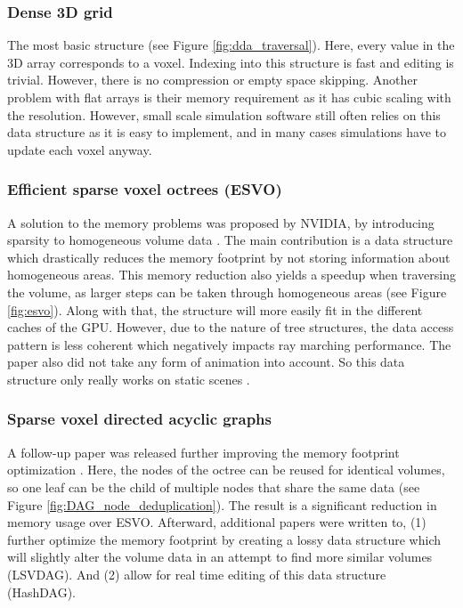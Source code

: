 \subsubsection{Dense 3D grid} \label{related_work:voxel_data_structures:dense_grid}
The most basic structure (see Figure \ref{fig:dda_traversal}). Here, every value in the 3D array corresponds to a voxel. Indexing into this structure is fast and editing is trivial. However, there is no compression or empty space skipping. Another problem with flat arrays is their memory requirement as it has cubic scaling with the resolution. However, small scale simulation software still often relies on this data structure as it is easy to implement, and in many cases simulations have to update each voxel anyway.



\subsubsection{Efficient sparse voxel octrees (ESVO)} \label{related_work:voxel_data_structures:esvo}
A solution to the memory problems was proposed by NVIDIA, by introducing sparsity to homogeneous volume data \cite{laine2010efficient}. The main contribution is a data structure which drastically reduces the memory footprint by not storing information about homogeneous areas. This memory reduction also yields a speedup when traversing the volume, as larger steps can be taken through homogeneous areas (see Figure \ref{fig:esvo}). Along with that, the structure will more easily fit in the different caches of the GPU. However, due to the nature of tree structures, the data access pattern is less coherent which negatively impacts ray marching performance. The paper also did not take any form of animation into account. So this data structure only really works on static scenes \cite{JohnLinPerfectEngine}.


\subsubsection{Sparse voxel directed acyclic graphs} \label{related_work:voxel_data_structures:svdag}
A follow-up paper was released further improving the memory footprint optimization \cite{kampe2013high}. Here, the nodes of the octree can be reused for identical volumes, so one leaf can be the child of multiple nodes that share the same data (see Figure \ref{fig:DAG_node_deduplication}). The result is a significant reduction in memory usage over ESVO. Afterward, additional papers were written to, (1) further optimize the memory footprint by creating a lossy data structure which will slightly alter the volume data in an attempt to find more similar volumes \cite{van2020lossy} (LSVDAG). And (2) allow for real time editing of this data structure \cite{careil2020interactively} (HashDAG).

